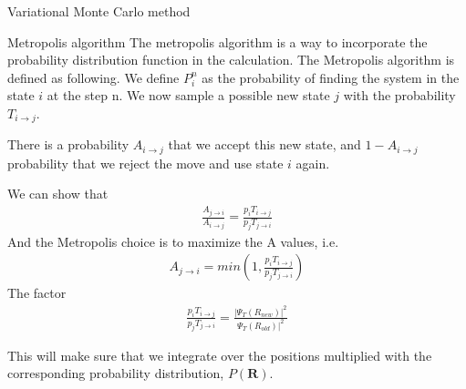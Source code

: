 \documentclass[a4paper, 12pt, titlepage]{article}
\begin{document}
\begin{section}{Variational Monte Carlo method}
 \begin{subsection}{Metropolis algorithm}
 	The metropolis algorithm is a way to incorporate the probability distribution function in the calculation. The Metropolis algorithm is defined as following. We define $P_i^n$ as the probability of finding the system in the state $i$ at the step n. 
 	We now sample a possible new state $j$ with the probability $T_{i\to j}$. 

 	There is a probability $A_{i\to j}$ that we accept this new state, and $1-A_{i \to j}$ probability that we reject the move and use state $i$ again. 

 	We can show that 
	\begin{align}
 		\frac{A_{j\to i}}{A_{i\to j}} = \frac{p_i T_{i\to j}}{p_j T_{j\to i}}	
 	\end{align}
 	And the Metropolis choice is to maximize the A values, i.e. 
 	\begin{align}
 		A_{j \to i} = min\left( 1, \frac{p_i T_{i\to j}}{p_j T_{j\to i}} \right)
 	\end{align}
 	The factor 
 	\begin{align}
 		\frac{p_i T_{i\to j}}{p_j T_{j\to i}} = \frac{|\Psi_T(R_{new})|^2}{\Psi_T(R_{old})|^2}
 	\end{align}

 	This will make sure that we integrate over the positions multiplied with the corresponding probability distribution, $P(\mathbf{R})$. 


 \end{subsection}


\end{section}
\end{document}
